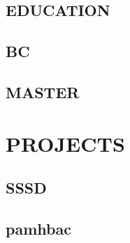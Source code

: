 \documentclass{mycv}
\begin{document}
\begin{paracol}{2}
\section{EDUCATION}
\subsection{BC}
\subsection{MASTER}

\end{paracol}

\newpage

\section{PROJECTS}

\subsection{SSSD}

\subsection{pamhbac}

\faGithub
\faTwitter
\faMapMarker
\faMale
\end{document}
